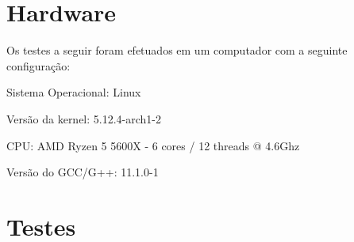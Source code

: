 \documentclass[12pt]{article}
\begin{document}
\section*{Hardware}
Os testes a seguir foram efetuados em um computador com a seguinte configuração:


Sistema Operacional: Linux


Versão da kernel: 5.12.4-arch1-2


CPU: AMD Ryzen 5 5600X - 6 cores / 12 threads @ 4.6Ghz


Versão do GCC/G++: 11.1.0-1


\section*{Testes}
\end{document}
